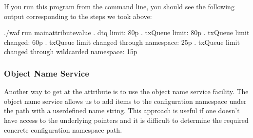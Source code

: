 \documentclass[letterpaper,10pt,english]{sphinxmanual}
\renewcommand{\sphinxcode}[1]{\texttt{\small{#1}}}
\begin{document}
\begin{sphinxVerbatim}[commandchars=\\\{\}]
 
              
  
 
               
\end{sphinxVerbatim}

If you run this program from the command line, you should see the following
output corresponding to the steps we took above:

\begin{sphinxVerbatim}[commandchars=\\\{\}]
\PYGZdl{} ./waf \PYGZhy{}\PYGZhy{}run main\PYGZhy{}attribute\PYGZhy{}value
.  dtq limit: 80p
.  txQueue limit: 80p
.  txQueue limit changed: 60p
.  txQueue limit changed through namespace: 25p
.  txQueue limit changed through wildcarded namespace: 15p
\end{sphinxVerbatim}


\subsubsection{Object Name Service}
\label{\detokenize{attributes:object-name-service}}
Another way to get at the attribute is to use the object name service facility.
The object name service allows us to add items to the configuration
namespace under the \sphinxcode{} path with a user\sphinxhyphen{}defined name string.
This approach is useful if one doesn’t have access to the underlying
pointers and it is difficult to determine the required concrete configuration
namespace path.

\begin{sphinxVerbatim}[commandchars=\\\{\}]
  
  


   
\end{sphinxVerbatim}
\end{document}

